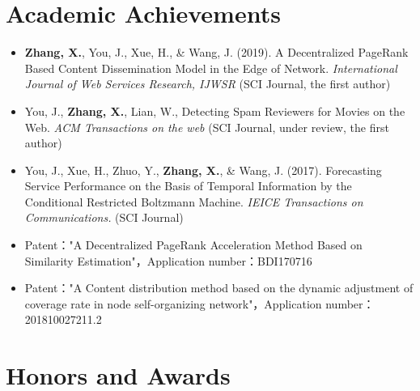 \documentclass{resume}
\begin{document}

\section{Academic Achievements}
\begin{itemize}[parsep=0.5ex]
  \item \textbf{Zhang, X.}, You, J., Xue, H., \& Wang, J. (2019). A Decentralized PageRank Based Content Dissemination Model in the Edge of Network. \textit{International Journal of Web Services Research, IJWSR} (SCI Journal, the first author)
  \item You, J., \textbf{Zhang, X.}, Lian, W., Detecting Spam Reviewers for Movies on the Web. \textit{ACM Transactions on the web} (SCI Journal, under review, the first author)
  \item You, J., Xue, H., Zhuo, Y., \textbf{Zhang, X.}, \& Wang, J. (2017). Forecasting Service Performance on the Basis of Temporal Information by the Conditional Restricted Boltzmann Machine. \textit{IEICE Transactions on Communications.} (SCI Journal)
  \item Patent："A Decentralized PageRank Acceleration Method Based on Similarity Estimation"，Application number：BDI170716
  \item Patent："A Content distribution method based on the dynamic adjustment of coverage rate in node self-organizing network"，Application number：201810027211.2
\end{itemize}

\section{Honors and Awards}
\end{document}
